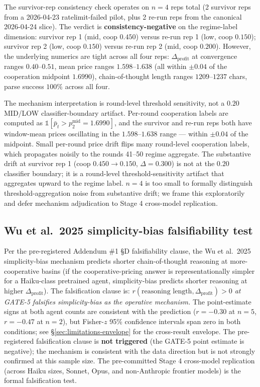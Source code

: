 The survivor-rep consistency check operates on $n = 4$ reps total (2 survivor reps from a 2026-04-23 ratelimit-failed pilot, plus 2 re-run reps from the canonical 2026-04-24 slice). The verdict is \textbf{consistency-negative} on the regime-label dimension: survivor rep 1 (mid, coop $0.450$) versus re-run rep 1 (low, coop $0.150$); survivor rep 2 (low, coop $0.150$) versus re-run rep 2 (mid, coop $0.200$). However, the underlying numerics are tight across all four reps: $\Delta_{\text{profit}}$ at convergence ranges $0.40$--$0.51$, mean price ranges $1.598$--$1.638$ (all within $\pm 0.04$ of the cooperation midpoint $1.6990$), chain-of-thought length ranges $1209$--$1237$ chars, parse success $100\%$ across all four.

The mechanism interpretation is round-level threshold sensitivity, not a $0.20$ MID/LOW classifier-boundary artifact. Per-round cooperation labels are computed as $\mathbb{1}[\bar{p}_t > p^{\text{mid}}_2 = 1.6990]$, and the survivor and re-run reps both have window-mean prices oscillating in the $1.598$--$1.638$ range --- within $\pm 0.04$ of the midpoint. Small per-round price drift flips many round-level cooperation labels, which propagates noisily to the rounds 41--50 regime aggregate. The substantive drift at survivor rep 1 (coop $0.450 \to 0.150$, $\Delta = 0.300$) is not at the $0.20$ classifier boundary; it is a round-level threshold-sensitivity artifact that aggregates upward to the regime label. $n = 4$ is too small to formally distinguish threshold-aggregation noise from substantive drift; we frame this exploratorily and defer mechanism adjudication to Stage 4 cross-model replication.

\subsection{Wu et al.\ 2025 simplicity-bias falsifiability test}
\label{sec:results-wu2025}

Per the pre-registered Addendum \#1 \S D falsifiability clause, the Wu et al.\ 2025 simplicity-bias mechanism predicts shorter chain-of-thought reasoning at more-cooperative basins (if the cooperative-pricing answer is representationally simpler for a Haiku-class pretrained agent, simplicity-bias predicts shorter reasoning at higher $\Delta_{\text{profit}}$). The falsification clause is: \emph{$r(\text{reasoning length}, \Delta_{\text{profit}}) > 0$ at GATE-5 falsifies simplicity-bias as the operative mechanism.} The point-estimate signs at both agent counts are consistent with the prediction ($r = -0.30$ at $n = 5$, $r = -0.47$ at $n = 2$), but Fisher-$z$ 95\% confidence intervals span zero in both conditions; see \S\ref{sec:limitations-envelope} for the cross-result envelope. The pre-registered falsification clause is \textbf{not triggered} (the GATE-5 point estimate is negative); the mechanism is consistent with the data direction but is not strongly confirmed at this sample size. The pre-committed Stage 4 cross-model replication (across Haiku sizes, Sonnet, Opus, and non-Anthropic frontier models) is the formal falsification test.

